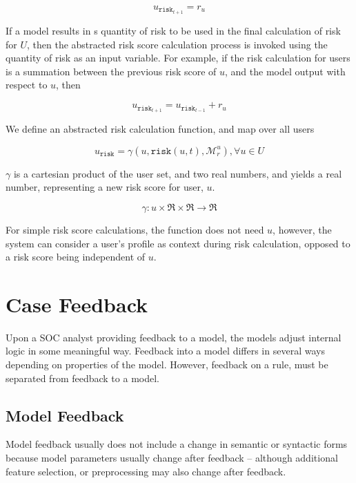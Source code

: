 \documentclass[10pt, titlepage, twocolumn]{article}
\begin{document}
\begin{equation}
u_{\texttt{risk}_{t+1}} = r_u
\end{equation}

If a model results in s quantity of risk to be used in the final calculation of risk for \(U\), then the abstracted risk score calculation process is invoked using the quantity of risk as an input variable. For example, if the risk calculation for users is a summation between the previous risk score of \(u\), and the model output with respect to \(u\), then

\begin{equation}
u_{\texttt{risk}_{t+1}} = u_{\texttt{risk}_{t-1}}+ r_u
\end{equation}

We define an abstracted risk calculation function, and map over all users

\begin{equation}
u_{\texttt{risk}} = \gamma(u, \texttt{risk}(u, t), \boldsymbol {\mathcal{M}}_{ r }^u), \forall u \in U
\end{equation}

\(\gamma\) is a cartesian product of the user set, and two real numbers, and yields a real number, representing a new risk score for user, \(u\). 

\begin{equation}
\gamma : u \times \Re \times \Re \rightarrow \Re
\end{equation}

For simple risk score calculations, the function does not need \(u\), however, the system can consider a user's profile as context during risk calculation, opposed to a risk score being independent of \(u\).





\section{Case Feedback}

Upon a SOC analyst providing feedback to a model, the models adjust internal logic in some meaningful way. Feedback into a model differs in several ways depending on properties of the model. However, feedback on a rule, must be separated from feedback to a model.

\subsection{Model Feedback}
Model feedback usually does not include a change in semantic or syntactic forms because model parameters usually change after feedback -- although additional feature selection, or preprocessing may also change after feedback.
\end{document}
